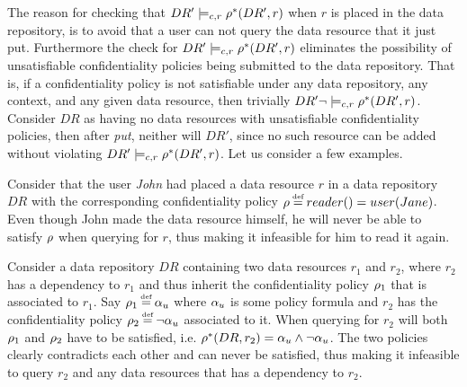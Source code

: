 The reason for checking that $DR' \models_{c,r} \rho^{\ast}(DR',r)$ when $r$ is placed in the data repository, is to avoid that a user can not query the data resource that it just put. Furthermore the check for $DR' \models_{c,r} \rho^{\ast}(DR',r)$ eliminates the possibility of unsatisfiable confidentiality policies being submitted to the data repository. That is, if a confidentiality policy is not satisfiable under any data repository, any context, and any given data resource, then trivially $DR' \lnot\models_{c,r} \rho^{\ast}(DR',r)$. Consider $DR$ as having no data resources with unsatisfiable confidentiality policies, then after \emph{put}, neither will $DR'$, since no such resource can be added without violating $DR' \models_{c,r} \rho^{\ast}(DR',r)$. Let us consider a few examples.

\begin{example}
Consider that the user \emph{John} had placed a data resource $r$ in a data repository $DR$ with the corresponding confidentiality policy $\conf \eqdef reader() = user(Jane)$. Even though John made the data resource himself, he will never be able to satisfy $\rho$ when querying for $r$, thus making it infeasible for him to read it again.
\end{example}

\begin{example}
Consider a data repository $DR$ containing two data resources $r_1$ and $r_2$, where $r_2$ has a dependency to $r_1$ and thus inherit the confidentiality policy $\rho_1$ that is associated to $r_1$. Say $\conf_1 \eqdef \upf$ where $\alpha_u$ is some policy formula and $r_2$ has the confidentiality policy $\conf_2 \eqdef \lnot \upf$ associated to it. When querying for $r_2$ will both $\rho_1$ and $\rho_2$ have to be satisfied, i.e. $\rho^{\ast}(DR,r_2) = \alpha_u \land \lnot \alpha_u$. The two policies clearly contradicts each other and can never be satisfied, thus making it infeasible to query $r_2$ and any data resources that has a dependency to $r_2$.
\end{example}

